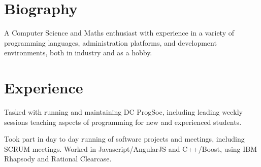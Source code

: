 \documentclass[11pt, a4paper]{cv}
\begin{document}
\begin{minipage}[t]{0.66\textwidth} %

\section{Biography}

A Computer Science and Maths enthusiast with experience in a variety of programming languages, administration platforms, and development environments, both in industry and as a hobby.

\sectionspace

\section{Experience}


\vspace{\topsep} %
\begin{tightitemize}
\item Tasked with running and maintaining DC ProgSoc, including leading weekly sessions teaching aspects of programming for new and experienced students.
\end{tightitemize}

\sectionspace



\sectionspace


\vspace{\topsep} %
\begin{tightitemize}
\item Took part in day to day running of software projects and meetings, including SCRUM meetings. Worked in Javascript/AngularJS and C++/Boost, using IBM Rhapsody and Rational Clearcase.
\end{tightitemize}

\sectionspace



\end{minipage}
\end{document}
